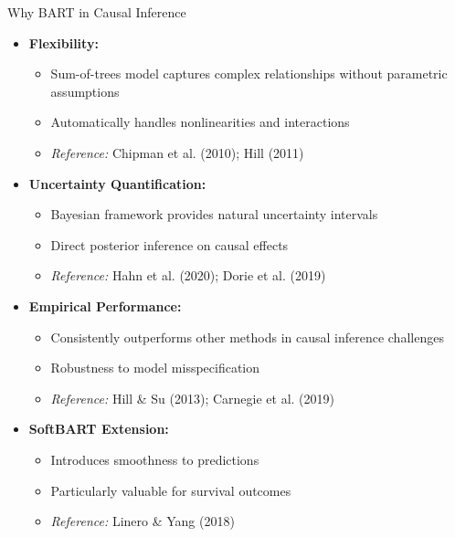 \documentclass{beamer}
\begin{document}
\begin{frame}{Why BART in Causal Inference}
\begin{itemize}
    \item \textbf{Flexibility:}
    \begin{itemize}
        \item Sum-of-trees model captures complex relationships without parametric assumptions
        \item Automatically handles nonlinearities and interactions
        \item \textit{Reference:} Chipman et al. (2010); Hill (2011)
    \end{itemize}
    \item \textbf{Uncertainty Quantification:}
    \begin{itemize}
        \item Bayesian framework provides natural uncertainty intervals
        \item Direct posterior inference on causal effects
        \item \textit{Reference:} Hahn et al. (2020); Dorie et al. (2019)
    \end{itemize}
    \item \textbf{Empirical Performance:}
    \begin{itemize}
        \item Consistently outperforms other methods in causal inference challenges
        \item Robustness to model misspecification
        \item \textit{Reference:} Hill \& Su (2013); Carnegie et al. (2019)
    \end{itemize}
    \item \textbf{SoftBART Extension:}
    \begin{itemize}
        \item Introduces smoothness to predictions
        \item Particularly valuable for survival outcomes
        \item \textit{Reference:} Linero \& Yang (2018)
    \end{itemize}
\end{itemize}
\end{frame}
\end{document}

